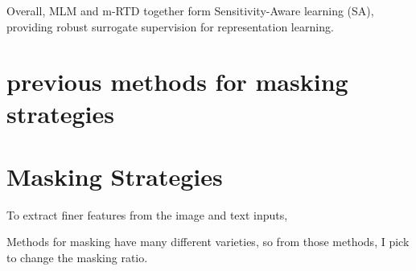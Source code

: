 Overall, MLM and m-RTD together form Sensitivity-Aware learning (SA), providing robust surrogate supervision for representation learning.


\section{previous methods for masking strategies}


\section{Masking Strategies}
To extract finer features from the image and text inputs, 

Methods for masking have many different varieties, so from those methods, I pick to change the masking ratio.
